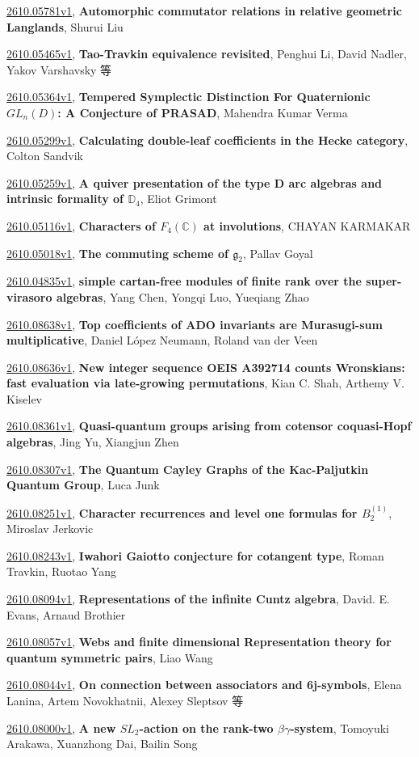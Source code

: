 \documentclass[9pt, a4paper]{article}
\theoremstyle{plain}
\theoremstyle{definition}
\theoremstyle{remark}
\newcommand{\arxiv}[3]{\href{https://arxiv.org/abs/#1}{#1}, \textbf{\textcolor{arxivblue}{#2}}, #3}
\begin{document}
\arxiv{2610.05781v1}{Automorphic commutator relations in relative geometric Langlands}{Shurui Liu}

\arxiv{2610.05465v1}{Tao-Travkin equivalence revisited}{Penghui Li, David Nadler, Yakov Varshavsky 等}

\arxiv{2610.05364v1}{Tempered Symplectic Distinction For Quaternionic $GL_n(D)$: A Conjecture of PRASAD}{Mahendra Kumar Verma}

\arxiv{2610.05299v1}{Calculating double-leaf coefficients in the Hecke category}{Colton Sandvik}

\arxiv{2610.05259v1}{A quiver presentation of the type D arc algebras and intrinsic formality of $\mathbb{D}_4$}{Eliot Grimont}

\arxiv{2610.05116v1}{Characters of $F_4(\mathbb{C})$ at involutions}{CHAYAN KARMAKAR}

\arxiv{2610.05018v1}{The commuting scheme of $\mathfrak{g}_2$}{Pallav Goyal}

\arxiv{2610.04835v1}{simple cartan-free modules of finite rank over the super-virasoro algebras}{Yang Chen, Yongqi Luo, Yueqiang Zhao}

\arxiv{2610.08638v1}{Top coefficients of ADO invariants are Murasugi-sum multiplicative}{Daniel López Neumann, Roland van der Veen}

\arxiv{2610.08636v1}{New integer sequence OEIS A392714 counts Wronskians: fast evaluation via late-growing permutations}{Kian C. Shah, Arthemy V. Kiselev}

\arxiv{2610.08361v1}{Quasi-quantum groups arising from cotensor coquasi-Hopf algebras}{Jing Yu, Xiangjun Zhen}

\arxiv{2610.08307v1}{The Quantum Cayley Graphs of the Kac-Paljutkin Quantum Group}{Luca Junk}

\arxiv{2610.08251v1}{Character recurrences and level one formulas for $B_2^{(1)}$}{Miroslav Jerkovic}

\arxiv{2610.08243v1}{Iwahori Gaiotto conjecture for cotangent type}{Roman Travkin, Ruotao Yang}

\arxiv{2610.08094v1}{Representations of the infinite Cuntz algebra}{David. E. Evans, Arnaud Brothier}

\arxiv{2610.08057v1}{Webs and finite dimensional Representation theory for quantum symmetric pairs}{Liao Wang}

\arxiv{2610.08044v1}{On connection between associators and 6j-symbols}{Elena Lanina, Artem Novokhatnii, Alexey Sleptsov 等}

\arxiv{2610.08000v1}{A new $SL_2$-action on the rank-two $βγ$-system}{Tomoyuki Arakawa, Xuanzhong Dai, Bailin Song}
\end{document}
